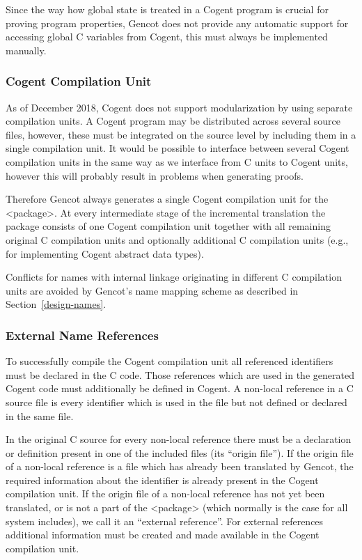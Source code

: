 Since the way how global state is treated in a Cogent program is crucial for proving program properties, Gencot does not 
provide any automatic support for accessing global C variables from Cogent, this must always be implemented manually.

\subsubsection{Cogent Compilation Unit}

As of December 2018, Cogent does not support modularization by using separate compilation units. A Cogent program may be distributed
across several source files, however, these must be integrated on the source level by including them in a single compilation unit.
It would be possible to interface between several Cogent compilation units in the same way as we interface from C units to Cogent
units, however this will probably result in problems when generating proofs. 

Therefore Gencot always generates a single Cogent compilation unit for the <package>. 
At every intermediate stage of the incremental translation the package consists of one Cogent compilation unit 
together with all remaining original C compilation units and optionally additional C compilation units (e.g., for implementing 
Cogent abstract data types).

Conflicts for names with internal linkage originating in different C compilation units are avoided by Gencot's name mapping scheme
as described in Section~\ref{design-names}.

\subsubsection{External Name References}
\label{design-modular-extref}

To successfully compile the Cogent compilation unit all referenced identifiers must be declared in the C code. Those references which are
used in the generated Cogent code must additionally be defined in Cogent. A non-local reference in a C source file is every
identifier which is used in the file but not defined or declared in the same file.

In the original C source for every non-local reference there must be a declaration or definition present in one of the included
files (its ``origin file''). If the origin file of a non-local reference is a file which has already been translated by 
Gencot, the required information about the identifier is already present in the Cogent compilation unit. If the origin file
of a non-local reference has not yet been translated, or is not a part of the <package> (which normally is the case for all
system includes), we call it an ``external reference''. For external references additional information must be created and 
made available in the Cogent compilation unit.


